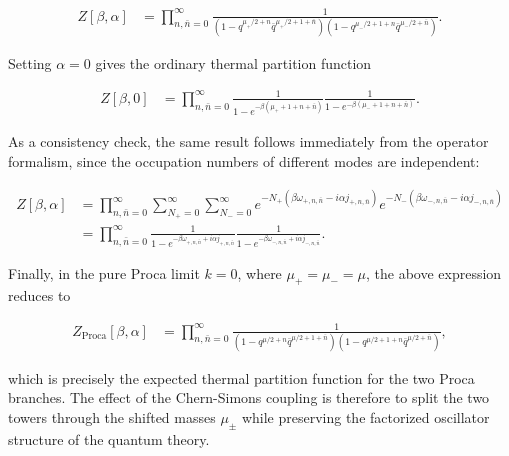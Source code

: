 \begin{align}
Z[\beta,\alpha] & =\prod ^{\infty}_{n,\bar{n}=0}\frac{1}{\left(1-q^{\mu _{+}/2+n}\bar{q}^{\mu _{+}/2+1+\bar{n}}\right)\left(1-q^{\mu _{-}/2+1+n}\bar{q}^{\mu _{-}/2+\bar{n}}\right)}.
\end{align}

Setting $\alpha =0$ gives the ordinary thermal partition function

\begin{align}
Z[\beta,0] & =\prod ^{\infty}_{n,\bar{n}=0}\frac{1}{1-e^{-\beta (\mu _{+}+1+n+\bar{n})}}\frac{1}{1-e^{-\beta (\mu _{-}+1+n+\bar{n})}}.
\end{align}

As a consistency check, the same result follows immediately from the operator formalism, since the occupation numbers of different modes are independent:

\begin{align}
Z[\beta,\alpha] & =\prod ^{\infty}_{n,\bar{n}=0}\sum ^{\infty}_{N_{+}=0}\sum ^{\infty}_{N_{-}=0}e^{-N_{+}(\beta \omega _{+,n,\bar{n}}-i\alpha j_{+,n,\bar{n}})}e^{-N_{-}(\beta \omega _{-,n,\bar{n}}-i\alpha j_{-,n,\bar{n}})} \\
& =\prod ^{\infty}_{n,\bar{n}=0}\frac{1}{1-e^{-\beta \omega _{+,n,\bar{n}}+i\alpha j_{+,n,\bar{n}}}}\frac{1}{1-e^{-\beta \omega _{-,n,\bar{n}}+i\alpha j_{-,n,\bar{n}}}}.
\end{align}

Finally, in the pure Proca limit $k=0$, where $\mu _{+}=\mu _{-}=\mu$, the above expression reduces to

\begin{align}
Z_{\mathrm{Proca}}[\beta,\alpha] & =\prod ^{\infty}_{n,\bar{n}=0}\frac{1}{\left(1-q^{\mu /2+n}\bar{q}^{\mu /2+1+\bar{n}}\right)\left(1-q^{\mu /2+1+n}\bar{q}^{\mu /2+\bar{n}}\right)},
\end{align}

which is precisely the expected thermal partition function for the two Proca branches. The effect of the Chern-Simons coupling is therefore to split the two towers through the shifted masses $\mu _{\pm}$ while preserving the factorized oscillator structure of the quantum theory.
